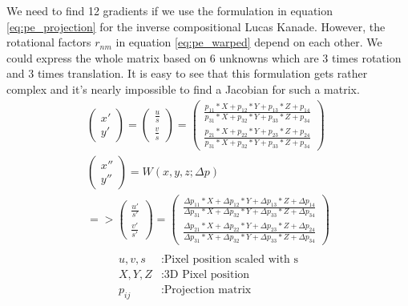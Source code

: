 \documentclass[11pt,a4paper,titlepage,oneside]{report}
\begin{document}
We need to find 12 gradients if we use the formulation in equation \ref{eq:pe_projection} for the inverse compositional Lucas Kanade. However, the rotational factors $r_{nm}$ in equation \ref{eq:pe_warped} depend on each other. We could express the whole matrix based on 6 unknowns which are 3 times rotation and 3 times translation. It is easy to see that this formulation gets rather complex and it's nearly impossible to find a Jacobian for such a matrix.\\
\begin{equation}\label{eq:pe_projection}
  \begin{gathered}
    \begin{pmatrix}
      x' \\
      y' 
    \end{pmatrix}=
    \begin{pmatrix}
      \frac{u}{s} \\
      \frac{v}{s} 
    \end{pmatrix}=
    \begin{pmatrix}
      \frac{p_{11}*X + p_{12}*Y + p_{13}*Z + p_{14}}{p_{31}*X + p_{32}*Y + p_{33}*Z + p_{34}}  \\
      \frac{p_{21}*X + p_{22}*Y + p_{23}*Z + p_{24}}{p_{31}*X + p_{32}*Y + p_{33}*Z + p_{34}}
    \end{pmatrix}\\
    \begin{pmatrix}
      x'' \\
      y'' 
    \end{pmatrix}=W(x,y,z;\Delta p)\\
    =>\begin{pmatrix}
      \frac{u'}{s'} \\
      \frac{v'}{s'} 
    \end{pmatrix}=
    \begin{pmatrix}
      \frac{\Delta p_{11}*X + \Delta p_{12}*Y + \Delta p_{13}*Z + \Delta p_{14}}{\Delta p_{31}*X + \Delta p_{32}*Y + \Delta p_{33}*Z + \Delta p_{34}}  \\
      \frac{\Delta p_{21}*X + \Delta p_{22}*Y + \Delta p_{23}*Z + \Delta p_{24}}{\Delta p_{31}*X + \Delta p_{32}*Y + \Delta p_{33}*Z + \Delta p_{34}}
    \end{pmatrix}\\
  \end{gathered}
\end{equation}
\begin{align*}
  u,v,s      &:  \text{Pixel position scaled with s}\\
  X,Y,Z      &:  \text{3D Pixel position}\\
  p_{ij}    &:  \text{Projection matrix}\\
\end{align*}
\end{document}
